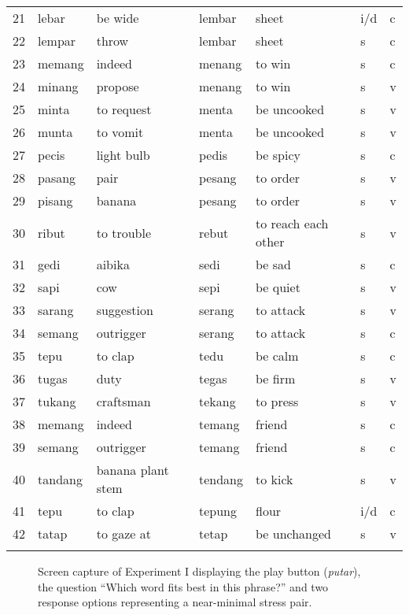 \begin{table}
{\begin{tabular}{rll @{}l@{} ll @{}l@{} ll}
21 & lebar & be wide & & lembar & sheet & & i/d & c\\
22 & lempar & throw & & lembar & sheet & & s & c\\
23 & memang & indeed & & menang & to win & & s & c\\
24 & minang & propose & & menang & to win & & s & v\\
25 & minta & to request & & menta & be uncooked & & s & v\\
26 & munta & to vomit & & menta & be uncooked & & s & v\\
27 & pecis & light bulb & & pedis & be spicy & & s & c\\
28 & pasang & pair & & pesang & to order & & s & v\\
29 & pisang & banana & & pesang & to order & & s & v\\
30 & ribut & to trouble & & rebut & to reach each other & & s & v\\
31 & gedi & aibika & & sedi & be sad & & s & c\\
32 & sapi & cow & & sepi & be quiet & & s & v\\
33 & sarang & suggestion & & serang & to attack & & s & v\\
34 & semang & outrigger & & serang & to attack & & s & c\\
35 & tepu & to clap & & tedu & be calm & & s & c\\
36 & tugas & duty & & tegas & be firm & & s & v\\
37 & tukang & craftsman & & tekang & to press & & s & v\\
38 & memang & indeed & & temang & friend & & s & c\\
39 & semang & outrigger & & temang & friend & & s & c\\
40 & tandang & banana plant stem & & tendang & to kick & & s & v\\
41 & tepu & to clap & & tepung & flour & & i/d & c\\
42 & tatap & to gaze at & & tetap & be unchanged & & s & v\\
\lspbottomrule
\end{tabular}
}
\end{table}

\begin{figure}[t]
\fbox{\texttt{[image: 303]}}
\caption{Screen capture of Experiment I displaying the play button (\textit{putar}), the question ``Which word fits best in this phrase?'' and two response options representing a near-minimal stress pair.}\label{fig303}
\end{figure}

